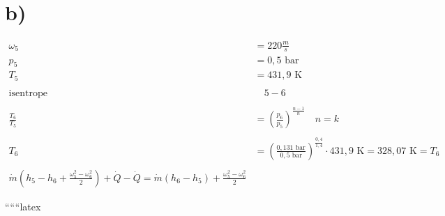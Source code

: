 

\section*{b)}

\begin{align*}
\omega_5 &= 220 \frac{m}{s} \\
p_5 &= 0,5 \text{ bar} \\
T_5 &= 431,9 \text{ K} \\
\\
\text{isentrope} & \quad 5-6 \\
\\
\frac{T_6}{T_5} &= \left( \frac{p_6}{p_5} \right)^{\frac{n-1}{n}} \quad n = k \\
\\
T_6 &= \left( \frac{0,131 \text{ bar}}{0,5 \text{ bar}} \right)^{\frac{0,4}{1,4}} \cdot 431,9 \text{ K} = 328,07 \text{ K} = T_6 \\
\\
\dot{m} \left( h_5 - h_6 + \frac{\omega_5^2 - \omega_6^2}{2} \right) + \dot{Q} - \dot{Q} = \dot{m} \left( h_6 - h_5 \right) + \frac{\omega_5^2 - \omega_6^2}{2}
\end{align*}

``````latex
